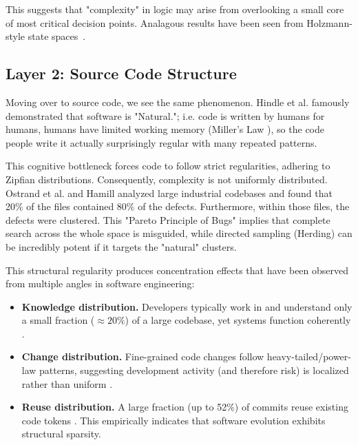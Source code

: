 \documentclass[runningheads]{llncs}
\begin{document}
This suggests 
that "complexity" in logic may arise
from overlooking a  small core of 
most critical decision points.   Analagous results
have been seen from Holzmann-style state spaces~\cite{pelanek2008properties}.

\subsection{Layer 2: Source Code Structure}
Moving over to source code, we see the same phenomenon. Hindle et al. 
\cite{Hindle12} famously demonstrated that software is "Natural."; i.e.  code is 
written by humans for humans,  humans have limited working memory 
(Miller's Law \cite{miller1956magical}),
so the code people write it actually
surprisingly regular with many repeated patterns.

This cognitive bottleneck forces code to follow strict regularities, adhering 
to Zipfian distributions. Consequently, complexity is not uniformly 
distributed. Ostrand et al. \cite{Ostrand04} and Hamill \cite{Hamill09} 
analyzed large industrial codebases and found that 20\% of the files 
contained 80\% of the defects. Furthermore, within those files, the 
defects were clustered. This "Pareto Principle of Bugs" implies that complete search across
the whole space
 is misguided, while directed sampling (Herding) can be incredibly 
potent if it targets the "natural" clusters.

This structural regularity produces concentration effects that have been observed
from multiple angles in software engineering:
\begin{itemize}
  \item \textbf{Knowledge distribution.} Developers typically work in and understand only
  a small fraction ($\approx 20\%$) of a large codebase, yet systems function coherently \cite{Peters15}.
  \item \textbf{Change distribution.} Fine-grained code changes follow heavy-tailed/power-law
  patterns, suggesting development activity (and therefore risk) is localized rather than uniform
  \cite{Lin15}.
  \item \textbf{Reuse distribution.} A large fraction (up to 52\%) of commits reuse existing code tokens \cite{martinez2014fix}. This empirically indicates that software evolution exhibits structural sparsity.
\end{itemize}
\end{document}
